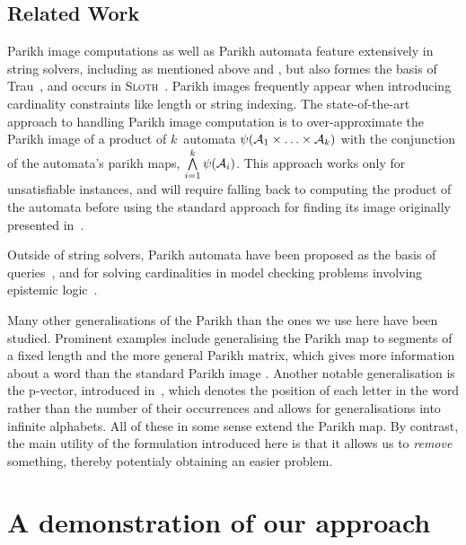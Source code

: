 \documentclass[acmsmall,review,anonymous,screen]{acmart}\settopmatter{printfolios=true,printccs=false,printacmref=true}
\theoremstyle{definition}
\begin{document}
\subsection{Related Work}

Parikh image computations as well as Parikh automata \cite{parikh-automata}
feature extensively in string solvers, including as mentioned above \Ostrich{}
and \OstrichPlus{} \cite{ostrich,ostrich-plus}, but also formes the basis of
Trau~\cite{trau-pldi}, and occurs in \textsc{Sloth}~\cite{sloth}. Parikh images
frequently appear when introducing cardinality constraints like length or string
indexing. The state-of-the-art approach to handling Parikh image computation is
to over-approximate the Parikh image of a product of $k$~automata
$\operatorname{\psi}(\mathcal{A}_1 \times \ldots \times \mathcal{A}_k)$ with the
conjunction of the automata's parikh maps, $\bigwedge\limits_{i=1} ^{k}
\operatorname{\psi}(\mathcal{A}_i)$. This approach works only for unsatisfiable instances,
and will require falling back to computing the product of the automata before
using the standard approach for finding its image originally presented in~\cite{generate-parikh-image}.

Outside of string solvers, Parikh automata have been proposed as the basis of
queries~\cite{graph-queries}, and for solving cardinalities in model checking
problems involving epistemic logic~\cite{epistemic-logic}.

Many other generalisations of the Parikh than the ones we use here have been
studied. Prominent examples include generalising the Parikh map to segments of a
fixed length \cite{KARHUMAKI1980155} and the more general Parikh matrix, which
gives more information about a word than the standard Parikh image
\cite{parikh-matrix}. Another notable generalisation is the p-vector, introduced
in~\cite{infinite-words}, which denotes the position of each letter in the word
rather than the number of their occurrences and allows for generalisations into
infinite alphabets. All of these in some sense extend the Parikh map. By
contrast, the main utility of the formulation introduced here is that it allows
us to \emph{remove} something, thereby potentialy obtaining an easier problem.

\section{A demonstration of our approach}\label{sec:motivation}
\end{document}
